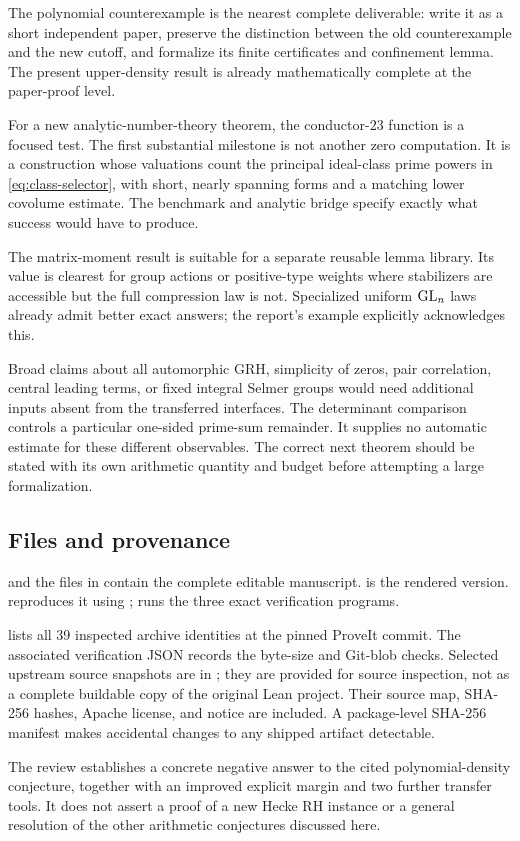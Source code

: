 The polynomial counterexample is the nearest complete deliverable:
write it as a short independent paper, preserve the distinction between
the old counterexample and the new cutoff, and formalize its finite
certificates and confinement lemma. The present upper-density result
is already mathematically complete at the paper-proof level.

For a new analytic-number-theory theorem, the conductor-\(23\) function
is a focused test. The first substantial milestone is not another
zero computation. It is a construction whose valuations count the
principal ideal-class prime powers in \eqref{eq:class-selector}, with
short, nearly spanning forms and a matching lower covolume estimate.
The benchmark and analytic bridge specify exactly what success would
have to produce.

The matrix-moment result is suitable for a separate reusable lemma
library. Its value is clearest for group actions or positive-type
weights where stabilizers are accessible but the full compression law
is not. Specialized uniform \(\operatorname{GL}_n\) laws already admit better exact
answers; the report's example explicitly acknowledges this.

Broad claims about all automorphic GRH, simplicity of zeros, pair
correlation, central leading terms, or fixed integral Selmer groups
would need additional inputs absent from the transferred interfaces.
The determinant comparison controls a particular one-sided
prime-sum remainder. It supplies no automatic estimate for these
different observables. The correct next theorem should be stated
with its own arithmetic quantity and budget before attempting a
large formalization.

\subsection{Files and provenance}

 and the files in  contain the complete
editable manuscript.  is the rendered version.
 reproduces it using ; 
runs the three exact verification programs.

 lists all 39 inspected archive
identities at the pinned ProveIt commit. The associated verification
JSON records the byte-size and Git-blob checks. Selected upstream
source snapshots are in ; they are
provided for source inspection, not as a complete buildable copy of the
original Lean project. Their source map, SHA-256 hashes, Apache license,
and notice are included. A package-level SHA-256 manifest makes
accidental changes to any shipped artifact detectable.

The review establishes a concrete negative answer to the cited
polynomial-density conjecture, together with an improved explicit
margin and two further transfer tools. It does not assert a proof
of a new Hecke RH instance or a general resolution of the other
arithmetic conjectures discussed here.
